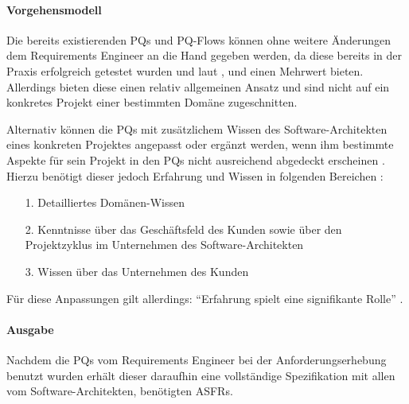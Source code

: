 \paragraph{Vorgehensmodell} \label{probing_model}

Die bereits existierenden PQs und PQ-Flows k\"onnen ohne weitere \"Anderungen dem Requirements Engineer an die Hand gegeben werden, da diese bereits in der Praxis erfolgreich getestet wurden und laut \cite{Ros01}, \cite{Ros02} und \cite{Ros03} einen Mehrwert bieten. Allerdings bieten diese einen relativ allgemeinen Ansatz und sind nicht auf ein konkretes Projekt einer bestimmten Dom\"ane zugeschnitten. 

Alternativ k\"onnen die PQs mit zus\"atzlichem Wissen des Software-Architekten eines konkreten Projektes angepasst oder erg\"anzt werden, wenn ihm bestimmte Aspekte f\"ur sein Projekt in den PQs nicht ausreichend abgedeckt erscheinen \cite{Ros02}. Hierzu ben\"otigt dieser jedoch Erfahrung und Wissen in folgenden Bereichen \cite{Ros02}: \\

\begin{itemize}
\item[1.] Detailliertes Dom\"anen-Wissen
\item[2.] Kenntnisse \"uber das Gesch\"aftsfeld des Kunden sowie \"uber den Projektzyklus im Unternehmen des Software-Architekten
\item[3.] Wissen \"uber das Unternehmen des Kunden \\
\end{itemize}

F\"ur diese Anpassungen gilt allerdings: ``Erfahrung spielt eine signifikante Rolle'' \cite{Ros02}. \\

\paragraph{Ausgabe}

Nachdem die PQs vom Requirements Engineer bei der Anforderungserhebung benutzt wurden erh\"alt dieser daraufhin eine vollst\"andige Spezifikation mit allen vom Software-Architekten, ben\"otigten ASFRs. \\


